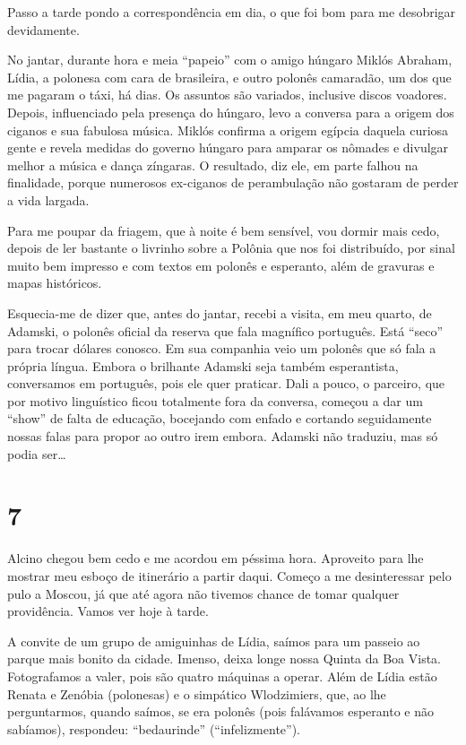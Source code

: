 Passo a tarde pondo a correspondência em dia, o que foi bom para me desobrigar devidamente.

No jantar, durante hora e meia ``papeio'' com o amigo húngaro Miklós Abraham, Lídia, a polonesa com cara de brasileira, e outro polonês camaradão, um dos que me pagaram o táxi, há dias. Os assuntos são variados, inclusive discos voadores. Depois, influenciado pela presença do húngaro, levo a conversa para a origem dos ciganos e sua fabulosa música. Miklós confirma a origem egípcia daquela curiosa gente e revela medidas do governo húngaro para amparar os nômades e divulgar melhor a música e dança zíngaras. O resultado, diz ele, em parte falhou na finalidade, porque numerosos ex-ciganos de perambulação não gostaram de perder a vida largada.

Para me poupar da friagem, que à noite é bem sensível, vou dormir mais cedo, depois de ler bastante o livrinho sobre a Polônia que nos foi distribuído, por sinal muito bem impresso e com textos em polonês e esperanto, além de gravuras e mapas históricos.

Esquecia-me de dizer que, antes do jantar, recebi a visita, em meu quarto, de Adamski, o polonês oficial da reserva que fala magnífico português. Está ``seco'' para trocar dólares conosco. Em sua companhia veio um polonês que só fala a própria língua. Embora o brilhante Adamski seja também esperantista, conversamos em português, pois ele quer praticar. Dali a pouco, o parceiro, que por motivo linguístico ficou totalmente fora da conversa, começou a dar um ``show'' de falta de educação, bocejando com enfado e cortando seguidamente nossas falas para propor ao outro irem embora. Adamski não traduziu, mas só podia ser\ldots

\section*{7 \adfflatleafright {}}
Alcino chegou bem cedo e me acordou em péssima hora. Aproveito para lhe mostrar meu esboço de itinerário a partir daqui. Começo a me desinteressar pelo pulo a Moscou, já que até agora não tivemos chance de tomar qualquer providência. Vamos ver hoje à tarde.

A convite de um grupo de amiguinhas de Lídia, saímos para um passeio ao parque mais bonito da cidade. Imenso, deixa longe nossa Quinta da Boa Vista. Fotografamos a valer, pois são quatro máquinas a operar. Além de Lídia estão Renata e Zenóbia (polonesas) e o simpático Wlodzimiers, que, ao lhe perguntarmos, quando saímos, se era polonês (pois falávamos esperanto e não sabíamos), respondeu: ``bedaurinde'' (``in\-fe\-liz\-men\-te'').

